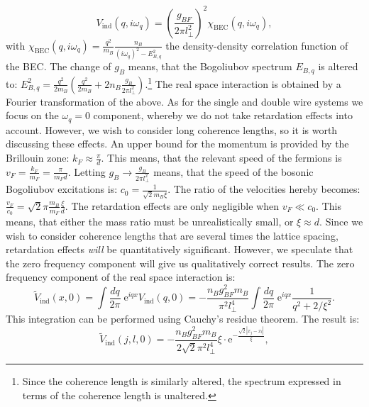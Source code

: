 \begin{equation}
V_{\text{ind}}(q, i\omega_q) = \left(\frac{g_{BF}}{2\pi l_{\perp}^2}\right)^2 \chi_\text{BEC}(q, i\omega_q), 
\label{eq.VFFmomentumspace.kitaevchain}
\end{equation}
with $\chi_\text{BEC}(q, i\omega_q) = \frac{q^2}{m_B}\frac{n_B}{(i\omega_q)^2 - E_{B,q}^2}$ the density-density correlation function of the BEC. The change of $g_B$ means, that the Bogoliubov spectrum $E_{B,q}$ is altered to: $E_{B,q}^2 = \frac{q^2}{2m_B}\left(\frac{q^2}{2m_B} + 2n_B\frac{g_B}{2\pi l_{\perp}^2}\right)$.\footnote{Since the coherence length is similarly altered, the spectrum expressed in terms of the coherence length is unaltered.} The real space interaction is obtained by a Fourier transformation of the above. As for the single and double wire systems we focus on the $\omega_q = 0$ component, whereby we do not take retardation effects into account. However, we wish to consider long coherence lengths, so it is worth discussing these effects. An upper bound for the momentum is provided by the Brillouin zone: $k_F \approx \frac{\pi}{d}$. This means, that the relevant speed of the fermions is $v_F = \frac{k_F}{m_F} = \frac{\pi}{m_Fd}$. Letting $g_B \to \frac{g_B}{2\pi l_{\perp}^2}$ means, that the speed of the bosonic Bogoliubov excitations is: $c_0 = \frac{1}{\sqrt{2}m_B\xi}$. The ratio of the velocities hereby becomes: $\frac{v_F}{c_0} = \sqrt{2}\pi\frac{m_B}{m_F}\frac{\xi}{d}$. The retardation effects are only negligible when $v_F\ll c_0$. This means, that either the mass ratio must be unrealistically small, or $\xi \approx d$. Since we wish to consider coherence lengths that are several times the lattice spacing, retardation effects \textit{will} be quantitatively significant. However, we speculate that the zero frequency component will give us qualitatively correct results. The zero frequency component of the real space interaction is:
\begin{equation}
\tilde{V}_{\text{ind}}(x, 0) = \int \frac{dq}{2\pi} \; \text{e}^{iqx}V_{\text{ind}}(q, 0) = -\frac{n_Bg_{BF}^2m_B}{\pi^2l_{\perp}^4}\int \frac{dq}{2\pi} \; \text{e}^{iqx} \frac{1}{q^2 + 2/\xi^2}. \nonumber
\end{equation}
This integration can be performed using Cauchy's residue theorem. The result is:
\begin{equation}
\tilde{V}_{\text{ind}}(j, l, 0) = -\frac{n_Bg_{BF}^2m_B}{2\sqrt{2}\pi^2l_{\perp}^4}\xi \cdot \text{e}^{-\frac{\sqrt{2}|x_j - x_l|}{\xi}},
\label{eq.Inducedcinteractionrealspace.kitaevchain}
\end{equation}
